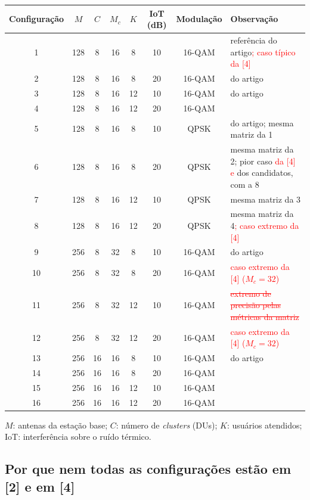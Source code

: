 \documentclass[11pt]{article}
\newcommand{\novo}[1]{\textcolor{red}{#1}}
\newcommand{\velho}[1]{\textcolor{red}{\sout{#1}}}
\begin{document}
\begin{center}
\small
\renewcommand{\arraystretch}{1.15}
\begin{tabular}{|c|c|c|c|c|c|c|l|}
\hline
Configuração & $M$ & $C$ & $M_c$ & $K$ & IoT (dB) & Modulação & Observação \\
\hline
1  & 128 & 8  & 16 & 8  & 10 & 16-QAM & referência do artigo\novo{; caso típico da [4]} \\
2  & 128 & 8  & 16 & 8  & 20 & 16-QAM & do artigo \\
3  & 128 & 8  & 16 & 12 & 10 & 16-QAM & do artigo \\
4  & 128 & 8  & 16 & 12 & 20 & 16-QAM &  \\
\hline
5  & 128 & 8  & 16 & 8  & 10 & QPSK   & do artigo; mesma matriz da 1 \\
6  & 128 & 8  & 16 & 8  & 20 & QPSK   & mesma matriz da 2; pior caso \novo{da [4] e} dos candidatos, com a 8 \\
7  & 128 & 8  & 16 & 12 & 10 & QPSK   & mesma matriz da 3 \\
8  & 128 & 8  & 16 & 12 & 20 & QPSK   & mesma matriz da 4\novo{; caso extremo da [4]} \\
\hline
9  & 256 & 8  & 32 & 8  & 10 & 16-QAM & do artigo \\
10 & 256 & 8  & 32 & 8  & 20 & 16-QAM & \novo{caso extremo da [4] ($M_c = 32$)} \\
11 & 256 & 8  & 32 & 12 & 10 & 16-QAM & \velho{extremo de precisão pelas métricas da matriz} \\
12 & 256 & 8  & 32 & 12 & 20 & 16-QAM & \novo{caso extremo da [4] ($M_c = 32$)} \\
\hline
13 & 256 & 16 & 16 & 8  & 10 & 16-QAM & do artigo \\
14 & 256 & 16 & 16 & 8  & 20 & 16-QAM &  \\
15 & 256 & 16 & 16 & 12 & 10 & 16-QAM &  \\
16 & 256 & 16 & 16 & 12 & 20 & 16-QAM &  \\
\hline
\end{tabular}
\end{center}

$M$: antenas da estação base; $C$: número de \textit{clusters} (DUs); $K$: usuários atendidos;
IoT: interferência sobre o ruído térmico.

\subsection*{Por que nem todas as configurações estão em [2] e em [4]}
\end{document}
